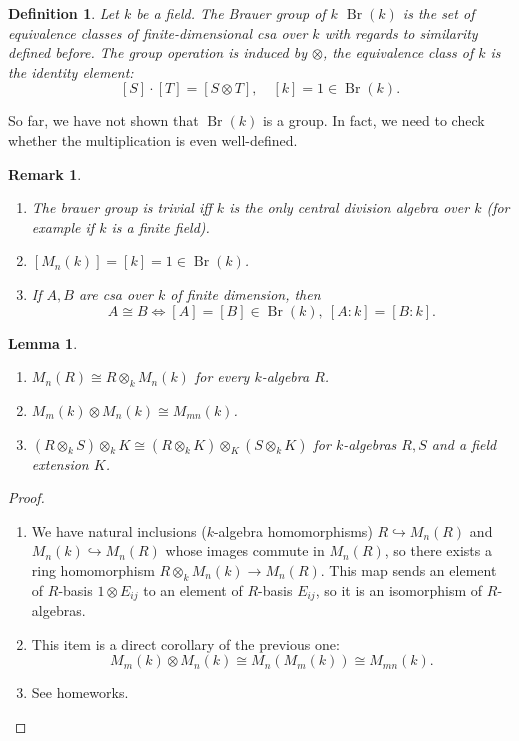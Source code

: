 \documentclass[10pt, a4paper]{article}
\newtheorem{defi}[thm]{Definition}
\newenvironment{noticeB}{%
  \tcolorbox[%
  notitle,
  empty,
  enhanced,  %
  breakable,
  coltext=black,
  colback=white, 
  fontupper=\rmfamily,
  noparskip,
  sharp corners,
  boxrule=-1pt,  %
  frame hidden,
  left=7pt,  %
  right=7pt,
  top=5pt,
  bottom=5pt,
  before skip=2.5ex plus 2pt,
  after skip=2.5ex plus 2pt,
  borderline west = {1.5pt}{-0.1pt}{blue!30!black}, %
  overlay unbroken and last={%
    \draw[color=black, line width=1.25pt]
    ($(frame.south west)+(1.pt, -0.1pt)$) -- ++(2em, 0);
  }
  ]}
{\endtcolorbox}
\newenvironment{definition}{\begin{noticeB}\begin{defi}}{%
    \end{defi}\end{noticeB}}
\newtheorem*{remark}{Remark}
\newtheorem{lemma}[thm]{Lemma}
\newenvironment{noticeC}{%
  \tcolorbox[%
  notitle,
  empty,
  enhanced,  %
  breakable,
  coltext=black, 
  fontupper=\rmfamily,
  noparskip,
  sharp corners,
  boxrule=-1pt,  %
  frame hidden,
  left=7pt,  %
  right=7pt,
  top=5pt,
  bottom=5pt,
  before skip=2.5ex plus 2pt,
  after skip=2.5ex plus 2pt,
  overlay unbroken and last={%
  },
  ]}
{\endtcolorbox}
\newenvironment{myproof}%
  {\begin{noticeC}\begin{proof}}%
  {\end{proof}\end{noticeC}}
\DeclareMathOperator{\brauer}{Br}
\begin{document}
\begin{definition}
  Let $k$ be a field. The Brauer group of $k$ $\brauer (k)$
  is the set of equivalence classes of finite-dimensional csa over $k$
  with regards to similarity defined before.
  The group operation is induced by $\otimes$, the equivalence class of $k$ is the identity element:
  $$[S] \cdot [T] = [S \otimes T], \quad [k] = 1 \in \brauer (k).$$
\end{definition}

So far, we have not shown that $\brauer (k)$ is a group. In fact, we need to  check whether the multiplication 
is even well-defined.

\begin{remark}
  \begin{enumerate}
    \item The brauer group is trivial iff $k$ is the only central division algebra over $k$ (for example if $k$ is a finite field).
    \item $[M_n (k)] = [k] = 1 \in \brauer (k)$. 
    \item If $A, B$ are csa over $k$ of finite dimension, then 
    $$A \cong B \Leftrightarrow [A] = [B] \in \brauer (k),\ [A: k] = [B: k].$$
  \end{enumerate}
\end{remark}

\begin{lemma}
  \begin{enumerate}
    \item $M_n (R) \cong R \otimes_k M_n (k)$ for every $k$-algebra $R$.
    \item $M_m (k) \otimes M_n (k) \cong M_{mn} (k)$.
    \item $(R \otimes_k S) \otimes_k K \cong (R \otimes_k K) \otimes_K (S \otimes_k K)$ for $k$-algebras $R, S$ and a field extension $K$.
  \end{enumerate}
\end{lemma}

\begin{myproof}
  \begin{enumerate}
    \item We have natural inclusions ($k$-algebra homomorphisms) $R \hookrightarrow M_n (R)$
    and 
    $M_n (k) \hookrightarrow M_n (R)$ whose images commute in $M_n (R)$, so there exists a ring homomorphism $R \otimes_k M_n (k) \to M_n (R)$.
    This map sends an element of $R$-basis $1 \otimes E_{ij}$ to an element of $R$-basis $E_{ij}$, so it is an isomorphism of $R$-algebras.
    \item This item is a direct corollary of the previous one:
    \begin{equation*}
      M_m (k) \otimes M_n (k) \cong M_n (M_m(k)) \cong M_{mn} (k).
    \end{equation*}
    \item See homeworks. \qedhere
  \end{enumerate}
\end{myproof}
\end{document}

